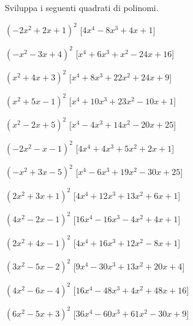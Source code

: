 \begin{esercizio}
 \label{ese:11.13}
Sviluppa i seguenti quadrati di polinomi.

\begin{enumeratea}
\spazielenx
\item \(\left(- 2 x^{2} + 2 x + 1\right)^{2}\)
  \hfill [\(4 x^{4} - 8 x^{3} + 4 x + 1\)]
\item \(\left(- x^{2} - 3 x + 4\right)^{2}\)
  \hfill [\(x^{4} + 6 x^{3} + x^{2} - 24 x + 16\)]
\item \(\left(x^{2} + 4 x + 3\right)^{2}\)
  \hfill [\(x^{4} + 8 x^{3} + 22 x^{2} + 24 x + 9\)]
\item \(\left(x^{2} + 5 x - 1\right)^{2}\)
  \hfill [\(x^{4} + 10 x^{3} + 23 x^{2} - 10 x + 1\)]
\item \(\left(x^{2} - 2 x + 5\right)^{2}\)
  \hfill [\(x^{4} - 4 x^{3} + 14 x^{2} - 20 x + 25\)]
\item \(\left(- 2 x^{2} - x - 1\right)^{2}\)
  \hfill [\(4 x^{4} + 4 x^{3} + 5 x^{2} + 2 x + 1\)]
\item \(\left(- x^{2} + 3 x - 5\right)^{2}\)
  \hfill [\(x^{4} - 6 x^{3} + 19 x^{2} - 30 x + 25\)]
\item \(\left(2 x^{2} + 3 x + 1\right)^{2}\)
  \hfill [\(4 x^{4} + 12 x^{3} + 13 x^{2} + 6 x + 1\)]
\item \(\left(4 x^{2} - 2 x - 1\right)^{2}\)
  \hfill [\(16 x^{4} - 16 x^{3} - 4 x^{2} + 4 x + 1\)]
\item \(\left(2 x^{2} + 4 x - 1\right)^{2}\)
  \hfill [\(4 x^{4} + 16 x^{3} + 12 x^{2} - 8 x + 1\)]
\item \(\left(3 x^{2} - 5 x - 2\right)^{2}\)
  \hfill [\(9 x^{4} - 30 x^{3} + 13 x^{2} + 20 x + 4\)]
\item \(\left(4 x^{2} - 6 x - 4\right)^{2}\)
  \hfill [\(16 x^{4} - 48 x^{3} + 4 x^{2} + 48 x + 16\)]
\item \(\left(6 x^{2} - 5 x + 3\right)^{2}\)
  \hfill [\(36 x^{4} - 60 x^{3} + 61 x^{2} - 30 x + 9\)]

\end{enumeratea}
\end{esercizio}
